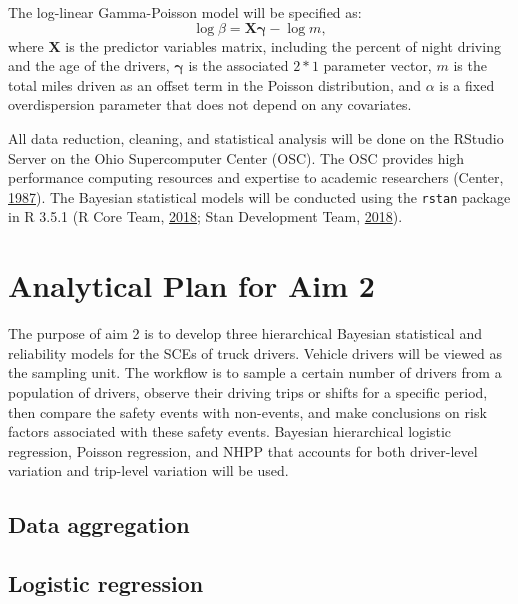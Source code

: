 \documentclass[12pt]{book}
\numberwithin{equation}{chapter}
\begin{document}
The log-linear Gamma-Poisson model will be specified as:
\[
\log\beta = \mathbf{X\gamma} - \log m,
\]
where \(\mathbf{X}\) is the predictor variables matrix, including the percent of night driving and the age of the drivers, \(\mathbf{\gamma}\) is the associated \(2*1\) parameter vector, \(m\) is the total miles driven as an offset term in the Poisson distribution, and \(\alpha\) is a fixed overdispersion parameter that does not depend on any covariates.

All data reduction, cleaning, and statistical analysis will be done on the RStudio Server on the Ohio Supercomputer Center (OSC). The OSC provides high performance computing resources and expertise to academic researchers (Center, \protect\hyperlink{ref-OSC1987}{1987}). The Bayesian statistical models will be conducted using the \texttt{rstan} package in R 3.5.1 (R Core Team, \protect\hyperlink{ref-Rcitation}{2018}; Stan Development Team, \protect\hyperlink{ref-rstancitation}{2018}).

\hypertarget{analytical-plan-for-aim-2}{%
\section{Analytical Plan for Aim 2}\label{analytical-plan-for-aim-2}}

The purpose of aim 2 is to develop three hierarchical Bayesian statistical and reliability models for the SCEs of truck drivers. Vehicle drivers will be viewed as the sampling unit. The workflow is to sample a certain number of drivers from a population of drivers, observe their driving trips or shifts for a specific period, then compare the safety events with non-events, and make conclusions on risk factors associated with these safety events. Bayesian hierarchical logistic regression, Poisson regression, and NHPP that accounts for both driver-level variation and trip-level variation will be used.

\hypertarget{data-aggregation}{%
\subsection{Data aggregation}\label{data-aggregation}}

\hypertarget{logistic-regression}{%
\subsection{Logistic regression}\label{logistic-regression}}
\end{document}
